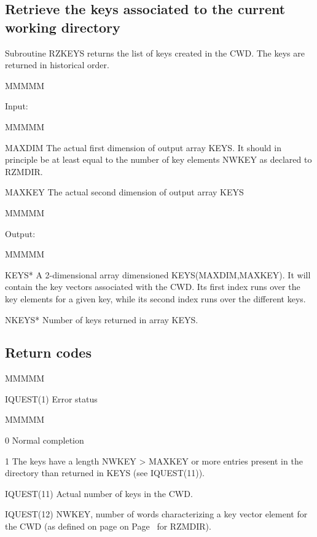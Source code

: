 \subsection{Retrieve the keys associated to the current working directory}
\par Subroutine RZKEYS returns the list of keys created in the CWD.
The keys are returned in historical order.
\begin{DL}{MMMMM}
\item[Input:
]
\begin{DL}{MMMMM}
\item[MAXDIM
]The actual first dimension of output array KEYS.
It should in principle be at least equal to the number of key elements
NWKEY as declared to RZMDIR.
\item[MAXKEY
]The actual second dimension of output array KEYS
\end{DL}
\end{DL}
\begin{DL}{MMMMM}
\item[Output:
]
\begin{DL}{MMMMM}
\item[KEYS*
]A 2-dimensional array dimensioned KEYS(MAXDIM,MAXKEY).
It will contain the key vectors associated with the CWD.
\newline Its first index runs over the key elements for a given key, while
its second index runs over the different keys.
\item[NKEYS*
]Number of keys returned in array KEYS.
\end{DL}
\end{DL}
\subsection{Return codes}
\begin{DL}{MMMMM}
\item[IQUEST(1)
]Error status
\begin{DL}{MMMMM}
\item[0
]Normal completion
\item[1
]The keys have a length NWKEY > MAXKEY
\newline  or more entries present in the directory than returned in KEYS
(see IQUEST(11)).
\end{DL}
\par
\item[IQUEST(11)
]Actual number of keys in the CWD.
\item[IQUEST(12)
]NWKEY, number of words characterizing a key vector element for the
CWD (as defined on page
on Page~\pageref{RZMDIR FORM=PAGEONLY} for RZMDIR).
\end{DL}
